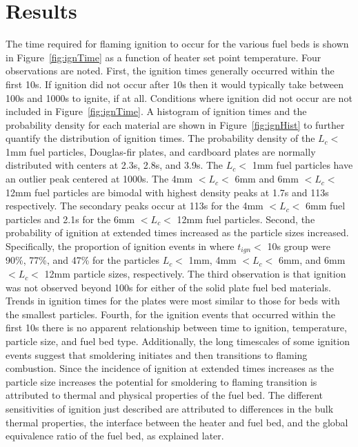 \section{Results}
   The time required for flaming ignition to occur for the various fuel beds is shown in Figure~\ref{fig:ignTime} as a function of heater set point temperature. Four observations are noted. First, the ignition times generally occurred  within the first 10\si{\second}.  If ignition did not occur after 10\si{\second} then it would typically take between 100\si{\second} and 1000\si{\second} to ignite, if at all. Conditions where ignition did not occur are not included in Figure~\ref{fig:ignTime}. A histogram of ignition times and the probability density for each material are shown in Figure~\ref{fig:ignHist} to further quantify the distribution of ignition times. The probability density of the $L_{c}<$ 1\si{\milli\meter} fuel particles, Douglas-fir plates, and cardboard plates are normally distributed with centers at 2.3\si{\second}, 2.8\si{\second}, and 3.9\si{\second}. The $L_{c}<$ 1\si{\milli\meter} fuel particles have an outlier peak centered at 1000\si{\second}. The 4\si{\milli\meter} $<L_{c}<$ 6\si{\milli\meter} and 6\si{\milli\meter} $<L_{c}<$ 12\si{\milli\meter} fuel particles are bimodal with highest density peaks at 1.7\si{\second} and 113\si{\second} respectively. The secondary peaks occur at 113\si{\second} for the 4\si{\milli\meter} $<L_{c}<$ 6\si{\milli\meter} fuel particles and 2.1\si{\second} for the 6\si{\milli\meter} $<L_{c}<$ 12\si{\milli\meter} fuel particles. Second, the probability of ignition at extended times increased as the particle sizes increased. Specifically, the proportion of ignition events in where $t_{ign} <$ 10\si{\second} group were 90\%, 77\%, and 47\% for the particles $L_{c}<$ 1\si{\milli\meter}, 4\si{\milli\meter} $<L_{c}<$ 6\si{\milli\meter}, and 6\si{\milli\meter} $<L_{c}<$ 12\si{\milli\meter} particle sizes, respectively. The third observation is that ignition was not observed beyond 100s for either of the solid plate fuel bed materials. Trends in ignition times for the plates were most similar to those for beds with the smallest particles. Fourth, for the ignition events that occurred within the first 10\si{\second} there is no apparent relationship between time to ignition, temperature, particle size, and fuel bed type. Additionally, the long timescales of some ignition events suggest that smoldering initiates and then transitions to flaming combustion. Since the incidence of ignition at extended times increases as the particle size increases the potential for smoldering to flaming transition is attributed to thermal and physical properties of the fuel bed. The different sensitivities of ignition just described are attributed to differences in the bulk thermal properties, the interface between the heater and fuel bed, and the global equivalence ratio of the fuel bed, as explained later. 
